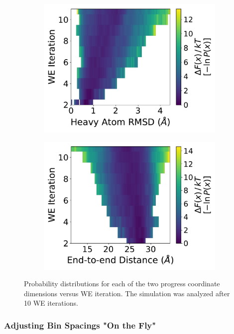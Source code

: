\documentclass[9pt,tutorial,pubversion]{livecoms}
\begin{document}
\begin{figure}
\centering
\begin{subfigure}[A]{0.35\textwidth}
\includegraphics[width=\linewidth]{Figure6A.pdf}
\end{subfigure}
\begin{subfigure}[B]{0.35\textwidth}
\includegraphics[width=\linewidth]{Figure6B.pdf}
\end{subfigure}
\caption{Probability distributions for each of the two progress coordinate dimensions versus WE iteration. 
The simulation was analyzed after 10 WE iterations.}
\label{fig:view}
\end{figure}

\subsubsection{Adjusting Bin Spacings "On the Fly"}
\end{document}
